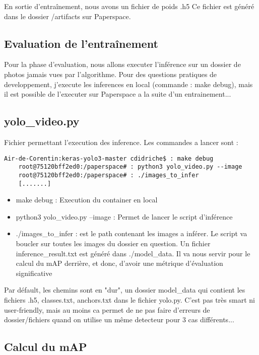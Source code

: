 En sortie d'entraînement, nous avons un fichier de poids .h5
Ce fichier est généré dans le dossier /artifacts sur Paperspace.

\subsection{Evaluation de l'entraînement}

Pour la phase d'evaluation, nous allons executer l'inférence sur un dossier de photos jamais vues par l'algorithme.
Pour des questions pratiques de developpement, j'execute les inferences en local (commande : make debug), mais il est possible de l'executer sur Paperspace a la suite d'un entrainement...

\subsection{yolo_video.py}

Fichier permettant l'execution des inference. Les commandes a lancer sont :
\begin{lstlisting}[style=console]
    Air-de-Corentin:keras-yolo3-master cdidriche$ : make debug
    root@75120bff2ed0:/paperspace# : python3 yolo_video.py --image
    root@75120bff2ed0:/paperspace# : ./images_to_infer
    [.......]
\end{lstlisting}

\begin{itemize}
    \item make debug : Execution du container en local
    \item python3 yolo_video.py --image : Permet de lancer le script d'inférence
    \item ./images_to_infer : est le path contenant les images a inférer. Le script va boucler sur toutes les images du dossier en question. Un fichier inference_result.txt est généré dans ./model_data. Il va nous servir pour le calcul du mAP derrière, et donc, d'avoir une métrique d'évaluation significative
\end{itemize}

Par défault, les chemins sont en "dur", un dossier model_data qui contient les fichiers .h5, classes.txt, anchors.txt dans le fichier yolo.py.
C'est pas très smart ni user-friendly, mais au moins ca permet de ne pas faire d'erreurs de dossier/fichiers quand on utilise un même detecteur pour 3 cas différents...

\subsection{Calcul du mAP}

